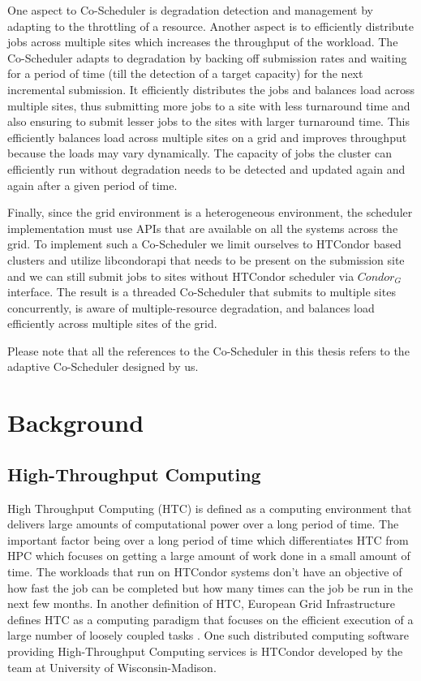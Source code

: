 \documentclass[ms,electronic,double]{nuthesis}
\begin{document}
One aspect to Co-Scheduler is degradation detection and management by adapting 
to the throttling of a resource. Another aspect is to efficiently distribute jobs 
across multiple sites which increases the throughput of the workload. The Co-Scheduler adapts to degradation by backing off submission rates and waiting for a 
period of time (till the detection of a target capacity) for the next incremental submission. It efficiently 
distributes the jobs and balances load across multiple sites, thus submitting more 
jobs to a site with less turnaround time and also ensuring to submit lesser 
jobs to the sites with larger turnaround time. This efficiently balances load 
across multiple sites on a grid and improves throughput because the loads may vary dynamically. 
The capacity of jobs the cluster can efficiently run without degradation needs to be detected and updated again and 
again after a given period of time.

Finally, since the grid environment is a heterogeneous environment, the scheduler implementation must use APIs that are available on all the systems across the grid. To implement such a Co-Scheduler
 we limit ourselves to HTCondor based clusters and utilize libcondorapi that needs to be present on the submission site and we can still submit jobs to sites without HTCondor scheduler via $Condor_G$ interface. 
 The result is a threaded Co-Scheduler 
that submits to multiple sites concurrently, is aware of multiple-resource degradation, and
balances load efficiently across multiple sites of the grid. 

Please note that all the references to the Co-Scheduler in this thesis refers to the adaptive Co-Scheduler designed 
by us.  

\chapter{Background}

\section{High-Throughput Computing} High Throughput Computing (HTC) is defined as 
a computing environment that delivers large amounts of computational
power over a long period of time. The important factor being over a long period of time which 
differentiates HTC from HPC which focuses on getting a large amount of work done in a small amount of time.
The workloads that run on HTCondor systems don't have an objective of  how fast the job can be completed 
but how many times can the job be run in the next few months. In another definition of HTC, European Grid  
Infrastructure defines HTC as a computing paradigm that focuses on the efficient 
execution of a large number of loosely coupled tasks \cite{manual56}. One such 
distributed computing software providing High-Throughput Computing services is 
HTCondor developed by the team at University of Wisconsin-Madison\cite{manual56}.
\end{document}
